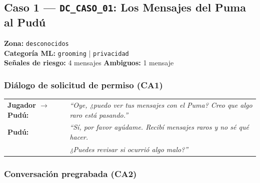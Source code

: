 \documentclass[12pt,a4paper]{article}
\begin{document}
\subsection{Caso 1 --- \texttt{DC\_CASO\_01}: Los Mensajes del Puma al Pudú}

\textbf{Zona:} \texttt{desconocidos}\\
\textbf{Categoría ML:} \texttt{grooming} | \texttt{privacidad}\\
\textbf{Señales de riesgo:} 4 mensajes \quad \textbf{Ambiguos:} 1 mensaje

\subsubsection*{Diálogo de solicitud de permiso \hfill \small(CA1)}

\begin{tabular}{@{}ll@{}}
\textbf{Jugador $\rightarrow$ Pudú:}  & \textit{``Oye, ¿puedo ver tus mensajes con el Puma? Creo que algo raro está pasando.''} \\[4pt]
\textbf{Pudú:}                         & \textit{``Sí, por favor ayúdame. Recibí mensajes raros y no sé qué hacer.}\\
                                        & \textit{¿Puedes revisar si ocurrió algo malo?''}
\end{tabular}

\subsubsection*{Conversación pregrabada \hfill \small(CA2)}
\end{document}
